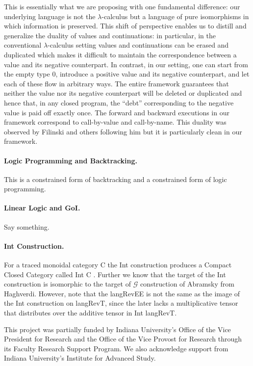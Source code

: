 \documentclass[preprint]{sigplanconf}
\newcommand{\G}{\ensuremath{\mathcal{G}}\xspace}
\begin{document}
This is essentially what we are proposing with one fundamental difference:
our underlying language is not the $\lambda$-calculus but a language of pure
isomorphisms in which information is preserved. This shift of perspective
enables us to distill and generalize the duality of values and continuations:
in particular, in the conventional $\lambda$-calculus setting values and
continuations can be erased and duplicated which makes it difficult to
maintain the correspondence between a value and its negative counterpart. In
contrast, in our setting, one can start from the empty type $0$, introduce a
positive value and its negative counterpart, and let each of these flow in
arbitrary ways. The entire framework guarantees that neither the value nor
its negative counterpart will be deleted or duplicated and hence that, in any
closed program, the ``debt'' corresponding to the negative value is paid off
exactly once. The forward and backward executions in our framework correspond
to call-by-value and call-by-name. This duality was observed by Filinski and
others following him but it is particularly clean in our framework.

\paragraph*{Logic Programming and Backtracking.} 
This is a constrained form of backtracking and a constrained form of
logic programming.

\paragraph*{Linear Logic and GoI.} 
Say something. 

\paragraph*{Int Construction.}
For a traced monoidal category {{C}} the Int construction produces a Compact
Closed Category called Int {{C}} \cite{joyal1996traced}.  Further we know
that the target of the Int construction is isomorphic to the target of \G
construction of Abramsky \cite{Abramsky96:0} from Haghverdi. However, note
that the {{langRevEE}} is not the same as the image of the Int construction
on {{langRevT}}, since the later lacks a multiplicative tensor that
distributes over the additive tensor in Int {{langRevT}}.


\acks This project was partially funded by Indiana University's Office
of the Vice President for Research and the Office of the Vice Provost
for Research through its Faculty Research Support Program.  We also
acknowledge support from Indiana University's Institute for Advanced
Study.

\begin{small}


\end{small}
\end{document}
